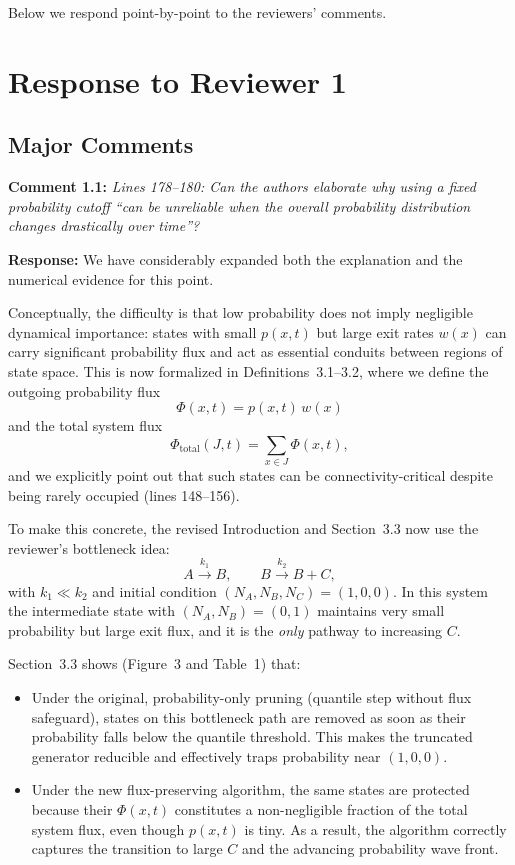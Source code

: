\documentclass[11pt]{article}
\begin{document}
Below we respond point-by-point to the reviewers' comments.

\section*{Response to Reviewer 1}

\subsection*{Major Comments}

\noindent\textbf{Comment 1.1:} \textit{Lines 178–180: Can the authors elaborate why using a fixed probability
cutoff ``can be unreliable when the overall probability distribution changes
drastically over time''?}

\textbf{Response:} We have considerably expanded both the explanation and the
numerical evidence for this point.

Conceptually, the difficulty is that low probability does not imply negligible
dynamical importance: states with small $p(x,t)$ but large exit rates $w(x)$ can
carry significant probability flux and act as essential conduits between regions of
state space. This is now formalized in Definitions~3.1–3.2, where we define the
outgoing probability flux
\[
  \Phi(x,t) = p(x,t)\,w(x)
\]
and the total system flux
\[
  \Phi_{\mathrm{total}}(J,t)
  = \sum_{x\in J} \Phi(x,t),
\]
and we explicitly point out that such states can be connectivity-critical despite
being rarely occupied (lines 148–156).

To make this concrete, the revised Introduction and Section~3.3 now use the
reviewer’s bottleneck idea:
\[
  A \xrightarrow{k_1} B, \qquad B \xrightarrow{k_2} B + C,
\]
with $k_1 \ll k_2$ and initial condition $(N_A,N_B,N_C) = (1,0,0)$. In this system
the intermediate state with $(N_A,N_B)=(0,1)$ maintains very small probability but
large exit flux, and it is the \emph{only} pathway to increasing $C$.

Section~3.3 shows (Figure~3 and Table~1) that:

\begin{itemize}
  \item Under the original, probability-only pruning (quantile step without flux
        safeguard), states on this bottleneck path are removed as soon as their
        probability falls below the quantile threshold. This makes the truncated
        generator reducible and effectively traps probability near $(1,0,0)$.
  \item Under the new flux-preserving algorithm, the same states are protected
        because their $\Phi(x,t)$ constitutes a non-negligible fraction of the
        total system flux, even though $p(x,t)$ is tiny. As a result, the
        algorithm correctly captures the transition to large $C$ and the advancing
        probability wave front.
\end{itemize}
\end{document}
